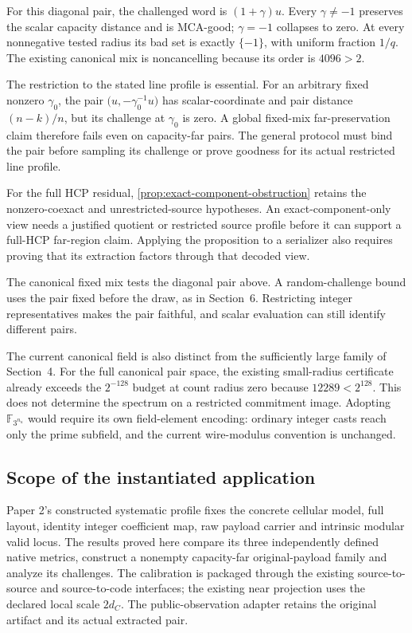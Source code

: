 For this diagonal pair, the challenged word is \((1+\gamma)u\). Every
\(\gamma\ne-1\) preserves the scalar capacity distance and is MCA-good;
\(\gamma=-1\) collapses to zero. At every nonnegative tested radius its bad
set is exactly \(\{-1\}\), with uniform fraction \(1/q\). The existing
canonical mix is noncancelling because its order is \(4096>2\).

The restriction to the stated line profile is essential. For an arbitrary
fixed nonzero \(\gamma_0\), the pair
\(\bigl(u,-\gamma_0^{-1}u\bigr)\) has scalar-coordinate and pair distance
\((n-k)/n\), but its challenge at \(\gamma_0\) is zero. A global fixed-mix
far-preservation claim therefore fails even on capacity-far pairs. The
general protocol must bind the pair before sampling its challenge or prove
goodness for its actual restricted line profile.

For the full HCP residual,
\cref{prop:exact-component-obstruction} retains the nonzero-coexact and
unrestricted-source hypotheses. An exact-component-only view needs a
justified quotient or restricted source profile before it can support a
full-HCP far-region claim. Applying the proposition to a serializer also
requires proving that its extraction factors through that decoded view.

The canonical fixed mix tests the diagonal pair above. A random-challenge
bound uses the pair fixed before the draw, as in Section~6. Restricting
integer representatives makes the pair faithful, and scalar evaluation
can still identify different pairs.

The current canonical field is also distinct from the sufficiently large
family of Section~4. For the full canonical pair space, the existing
small-radius certificate already exceeds the \(2^{-128}\) budget at count
radius zero because \(12289<2^{128}\). This does not determine the spectrum
on a restricted commitment image. Adopting \(\mathbb F_{3^{n_u}}\) would
require its own field-element encoding: ordinary integer casts reach only
the prime subfield, and the current wire-modulus convention is unchanged.

\subsection{Scope of the instantiated application}

Paper 2's constructed systematic profile fixes the concrete cellular model,
full layout, identity integer coefficient map, raw payload carrier and
intrinsic modular valid locus. The results proved here compare its three
independently defined native metrics, construct a nonempty capacity-far
original-payload family and analyze its challenges. The calibration is
packaged through the existing
source-to-source and source-to-code interfaces; the existing near projection
uses the declared local scale \(2d_C\). The public-observation adapter retains
the original artifact and its actual extracted pair.


